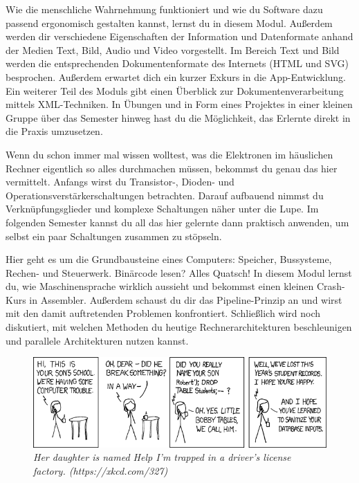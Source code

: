 \newpage

\label{lec:emi}
Wie die menschliche Wahrnehmung funktioniert und wie du Software dazu passend ergonomisch gestalten kannst, lernst du in diesem Modul.
Außerdem werden dir verschiedene Eigenschaften der Information und Datenformate anhand der Medien Text, Bild, Audio und Video vorgestellt.
Im Bereich Text und Bild werden die entsprechenden Dokumentenformate des Internets (HTML und SVG) besprochen.
Außerdem erwartet dich ein kurzer Exkurs in die App-Entwicklung.
Ein weiterer Teil des Moduls gibt einen Überblick zur Dokumentenverarbeitung mittels XML-Techniken.
In Übungen und in Form eines Projektes in einer kleinen Gruppe über das Semester hinweg hast du die Möglichkeit, das Erlernte direkt in die Praxis umzusetzen.

Wenn du schon immer mal wissen wolltest, was die Elektronen im häuslichen Rechner eigentlich so alles durchmachen müssen, bekommst du genau das hier vermittelt.
Anfangs wirst du Transistor-, Dioden- und Operationsverstärkerschaltungen betrachten.
Darauf aufbauend nimmst du Verknüpfungsglieder und komplexe Schaltungen näher unter die Lupe.
Im folgenden Semester kannst du all das hier gelernte dann praktisch anwenden, um selbst ein paar Schaltungen zusammen zu stöpseln.

Hier geht es um die Grundbausteine eines Computers:
Speicher, Bussysteme, Rechen- und Steuerwerk.
Binärcode lesen? Alles Quatsch! In diesem Modul lernst du, wie Maschinensprache wirklich aussieht und bekommst einen kleinen Crash-Kurs in Assembler.
Außerdem schaust du dir das Pipeline-Prinzip an und wirst mit den damit auftretenden Problemen konfrontiert.
Schließlich wird noch diskutiert, mit welchen Methoden du heutige Rechnerarchitekturen beschleunigen und parallele Architekturen nutzen kannst.

\vfill

\begin{figure}[h!]
\centering
\includegraphics[scale=.5]{img/xkcd/exploits_of_a_mom.png}
\caption*{{\small \textit{Her daughter is named Help I'm trapped in a driver's license factory. (https://xkcd.com/327)}}}
\end{figure}

